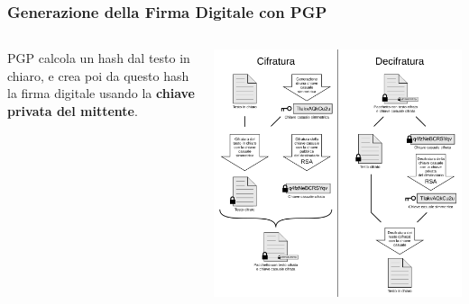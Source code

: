 \begin{frame}
	\frametitle{Generazione della Firma Digitale con PGP}

	\begin{columns}
		\begin{column}{0.4\textwidth}
			PGP calcola un hash dal testo in chiaro, e crea poi da questo hash la firma digitale usando la \textbf{chiave privata del mittente}.
		\end{column}

		\begin{column}{0.6\textwidth}
			\includegraphics[width=\textwidth]{img/1-img/PGP_diagram_IT.png}
		\end{column}
	\end{columns}

\end{frame}


